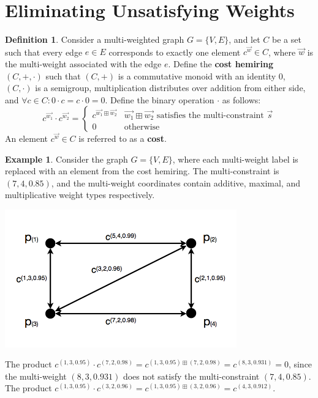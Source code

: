 \documentclass[12pt]{amsart}
\theoremstyle{definition}
\newtheorem{definition}[thm]{Definition}
\newtheorem{example}[thm]{Example}
\theoremstyle{remark}
\numberwithin{equation}{section}
\begin{document}
\section{Eliminating Unsatisfying Weights}

\begin{definition}
Consider a multi-weighted graph $G = \{V,E\}$, and let $C$ be a set such that every edge $e \in E$ corresponds to exactly one element $c^{\vec{w}} \in C$, where $\vec{w}$ is the multi-weight associated with the edge $e$. Define the \textbf{cost hemiring} $(C, +, \cdot)$ such that $(C, +)$ is a commutative monoid with an identity $0$, $(C, \cdot)$ is a semigroup, multiplication distributes over addition from either side, and $\forall c \in C : 0 \cdot c = c \cdot 0 = 0$. Define the binary operation $\cdot$ as follows:
$$
	c^{\vec{w_1}} \cdot c^{\vec{w_2}}  = \left\{
		\begin{array}{ll}
			c^{\vec{w_1} \boxplus \vec{w_2}} & \vec{w_1} \boxplus \vec{w_2} \text{ satisfies the multi-constraint } \vec{s} \\
			0             & \text{otherwise}
		\end{array}
	\right.
$$
An element $c^{\vec{w}} \in C$ is referred to as a \textbf{cost}.
\end{definition}

\begin{example}
Consider the graph $G = \{V, E\}$, where each multi-weight label is replaced with an element from the cost hemiring. The multi-constraint is $(7, 4, 0.85)$, and the multi-weight coordinates contain additive, maximal, and multiplicative weight types respectively.

\begin{center}\includegraphics[width=10cm]{figure-8-plus.png}\end{center}

The product $c^{(1,3,0.95)} \cdot c^{(7,2,0.98)} = c^{(1,3,0.95) \boxplus (7,2,0.98)} = c^{(8,3,0.931)} = 0$, since the multi-weight $(8,3,0.931)$ does not satisfy the multi-constraint $(7, 4, 0.85)$. The product $c^{(1,3,0.95)} \cdot c^{(3,2,0.96)} = c^{(1,3,0.95) \boxplus (3,2,0.96)} = c^{(4,3,0.912)}$.
\end{example}
\end{document}
